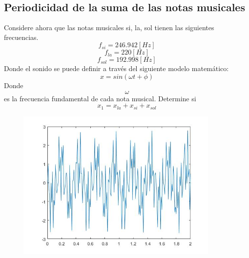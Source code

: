 \documentclass[12pt]{article}
\begin{document}
	\subsection{Periodicidad de la suma de las notas musicales}
	Considere ahora que las notas musicales si, la, sol tienen las siguientes frecuencias.
	\begin{equation}
		f_{si} = 246.942 [Hz]
	\end{equation}
	\begin{equation}
		f_{la} = 220 [Hz]
	\end{equation}
	\begin{equation}
		f_{sol} = 192.998 [Hz]
	\end{equation}
	Donde el sonido se puede definir a través del siguiente modelo matemático:
	\begin{equation}
		x = sin(\omega t + \phi)
	\end{equation}
	Donde \begin{equation*} \omega \end{equation*} es la frecuencia fundamental de cada nota musical. Determine si
	\begin{equation}
		x_1 = x_{la} + x_{si} + x_{sol}
	\end{equation}
	
	\begin{figure}[h]
		\centering
		\includegraphics[width=10cm]{6_2.jpg}
	\end{figure}
	\newpage
\end{document}
